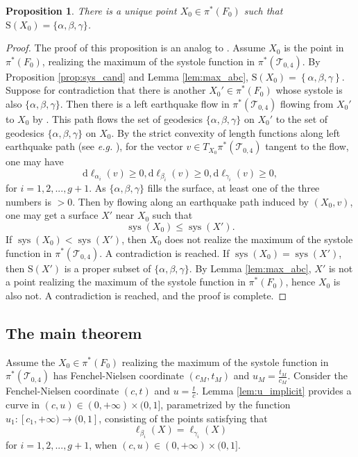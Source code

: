 \documentclass[UTF8]{amsart}
\newtheorem{proposition}[theorem]{Proposition}
\numberwithin{equation}{section}
\theoremstyle{definition}
\theoremstyle{example}
\theoremstyle{remark}
\DeclareMathOperator{\sys}{sys}
\begin{document}
\begin{proposition}
There is a unique point $X_0 \in \pi^{*}(F_0)$ such that $\mathrm{S}(X_0) = \{ \alpha, \beta, \gamma \}$. 
 \label{prop:unique}
\end{proposition}
\begin{proof}
 The proof of this proposition is an analog to \cite[Corollary 21]{schaller1999systoles}. 
 Assume $X_0$ is the point in $\pi^{*}(F_0)$, realizing the maximum of the systole function in $\pi^{*}(\mathcal{T}_{0,4})$. 
 By Proposition \ref{prop:sys_cand} and Lemma \ref{lem:max_abc}, $\mathrm{S}(X_0) = \left\{ \alpha, \beta, \gamma \right\} $. 
 Suppose for contradiction that there is another $X_0' \in \pi^{*}(F_0)$ whose systole is also $\{ \alpha, \beta, \gamma \}$. 
 Then there is a left earthquake flow in $\pi^{*}(\mathcal{T}_{0,4})$ flowing from $X_0'$ to $X_0$ by \cite[III.1.5.4.]{thurston2006earthquakes}. This path flows the set of geodesics $\{ \alpha, \beta, \gamma \}$ on $X_0'$ to the set of geodesics $\{ \alpha, \beta, \gamma \}$ on $X_0$. By the strict convexity of length functions along left earthquake path (see \emph{e.g.} \cite{kerckhoff1983nielsen}), for the vector $v \in T_{X_0}\pi^{*}(\mathcal{T}_{0,4})$ tangent to the flow, one may have
 \[
  \mathrm{d}\ell_{\alpha_i}(v) \ge 0, \mathrm{d}\ell_{\beta_i}(v) \ge 0, \mathrm{d}\ell_{\gamma_i}(v) \ge 0, 
 \]
 for $i =1,2,..., g+1$. As $\{ \alpha, \beta, \gamma \}$ fills the surface, at least one of the three numbers is $>0$. 
 Then by flowing along an earthquake path induced by $(X_0,v)$, one may get a surface $X'$ near $X_0$ such that 
 \[
  \sys(X_0) \le \sys(X'). 
 \]
 If $\sys(X_0) < \sys(X')$, then  $X_0$ does not realize the maximum of the systole function in $\pi^{*}(\mathcal{T}_{0,4})$. A contradiction is reached. 
If $\sys(X_0) = \sys(X')$, then
 $\mathrm{S}(X')$ is a proper subset of $\{ \alpha, \beta, \gamma \}$. 
 By Lemma \ref{lem:max_abc}, $X'$ is not a point realizing the maximum of the systole function in $\pi^{*}(F_0)$, hence $X_0$ is also not. A contradiction is reached, and the proof is complete. 
\end{proof}
\subsection{The main theorem}
Assume the $X_0\in \pi^{*}(F_0)$ realizing the maximum of the systole function in $\pi^{*}(\mathcal{T}_{0,4})$ has Fenchel-Nielsen coordinate $(c_M, t_M)$ and $u_M = \frac{t_M}{c_M}$. 
Consider the Fenchel-Nielsen coordinate $(c,t)$ and $u= \frac{t}{c}$. Lemma \ref{lem:u_implicit} provides a curve in $(c,u) \in (0,+\infty)\times (0,1]$, parametrized by the function $u_1:[c_1, +\infty)\to (0,1]$, consisting of the points satisfying that
\[
 \ell_{\beta_i}(X) = \ell_{\gamma_i}(X)
\]
for $i =1,2,...,g+1$, when $(c,u)\in (0,+\infty)\times (0,1]$. 
\end{document}
